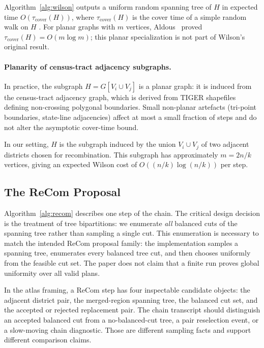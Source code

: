 \begin{theorem}
Algorithm~\ref{alg:wilson} outputs a uniform random spanning tree of $H$
in expected time $O(\tau_{\mathrm{cover}}(H))$, where $\tau_{\mathrm{cover}}(H)$
is the cover time of a simple random walk on $H$ \citep{wilson1996generating}.
For planar graphs with $m$ vertices, Aldous~\citeyearpar{aldous1991random}
proved $\tau_{\mathrm{cover}}(H) = O(m \log m)$; this planar specialization
is not part of Wilson's original result.
\end{theorem}

\paragraph{Planarity of census-tract adjacency subgraphs.}
In practice, the subgraph $H = G[V_i \cup V_j]$ is a planar graph: it is induced from the census-tract adjacency graph, which is derived from TIGER shapefiles defining non-crossing polygonal boundaries.
Small non-planar artefacts (tri-point boundaries, state-line adjacencies) affect at most a small fraction of steps and do not alter the asymptotic cover-time bound.

In our setting, $H$ is the subgraph induced by the union $V_i \cup V_j$
of two adjacent districts chosen for recombination.
This subgraph has approximately $m = 2n/k$ vertices, giving an expected
Wilson cost of $O((n/k)\log(n/k))$ per \recom{} step.

\subsection{The ReCom Proposal}

Algorithm~\ref{alg:recom} describes one step of the \recom{} chain.
The critical design decision is the treatment of tree bipartitions:
we enumerate \emph{all} balanced cuts of the spanning tree rather than
sampling a single cut.
This enumeration is necessary to match the intended ReCom proposal family:
the implementation samples a spanning tree, enumerates every balanced tree
cut, and then chooses uniformly from the feasible cut set. The paper does not
claim that a finite run proves global uniformity over all valid plans.

In the atlas framing, a ReCom step has four inspectable candidate objects:
the adjacent district pair, the merged-region spanning tree, the balanced cut
set, and the accepted or rejected replacement pair. The chain transcript should
distinguish an accepted balanced cut from a no-balanced-cut tree, a pair
reselection event, or a slow-moving chain diagnostic. Those are different
sampling facts and support different comparison claims.

